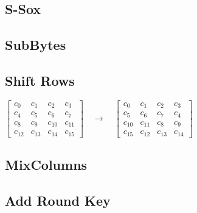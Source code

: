 \subsection{S-Sox}
\subsection{SubBytes}

\subsection{Shift Rows}

\noindent
\flushleft
\(
\begin{bmatrix}
c_0  & c_1  & c_2  & c_3  \\
c_4  & c_5  & c_6  & c_7  \\
c_8  & c_9  & c_{10} & c_{11} \\
c_{12} & c_{13} & c_{14} & c_{15}
\end{bmatrix}
\quad \rightarrow \quad
\begin{bmatrix}
c_0  & c_1  & c_2  & c_3  \\
c_5  & c_6  & c_7  & c_4  \\
c_{10} & c_{11} & c_8  & c_9  \\
c_{15} & c_{12} & c_{13} & c_{14}
\end{bmatrix}
\)
\flushleft
\subsection{MixColumns}
\subsection{Add Round Key}

